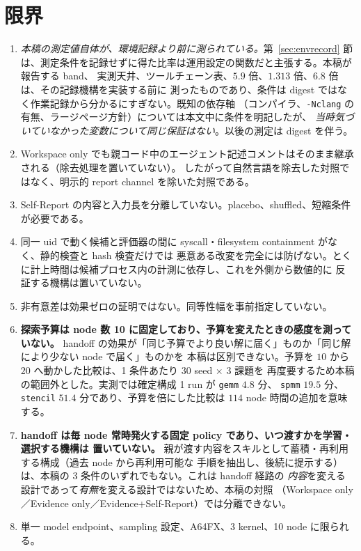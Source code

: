 \documentclass[conference,letterpaper]{IEEEtran}
\newcommand{\armW}{Workspace only}
\newcommand{\armE}{Evidence only}
\newcommand{\armS}{Evidence+Self-Report}
\begin{document}
\section{限界}
\begin{enumerate}
  \item \emph{本稿の測定値自体が、環境記録より前に測られている。}第~\ref{sec:envrecord}
    節は、測定条件を記録せずに得た比率は運用設定の関数だと主張する。本稿が報告する band、
    実測天井、ツールチェーン表、$5.9$ 倍、$1.313$ 倍、$6.8$ 倍は、その記録機構を実装する前に
    測ったものであり、条件は digest ではなく作業記録から分かるにすぎない。既知の依存軸
    （コンパイラ、\texttt{-Nclang} の有無、ラージページ方針）については本文中に条件を明記したが、
    \emph{当時気づいていなかった変数について同じ保証はない}。以後の測定は digest を伴う。
  \item \armW{} でも親コード中のエージェント記述コメントはそのまま継承される（除去処理を置いていない）。
    したがって自然言語を除去した対照ではなく、明示的 report channel を除いた対照である。
  \item Self-Report の内容と入力長を分離していない。placebo、shuffled、短縮条件が必要である。
  \item 同一 uid で動く候補と評価器の間に syscall・filesystem containment がなく、静的検査と hash 検査だけでは
    悪意ある改変を完全には防げない。とくに計上時間は候補プロセス内の計測に依存し、これを外側から数値的に
    反証する機構は置いていない。
  \item 非有意差は効果ゼロの証明ではない。同等性幅を事前指定していない。
  \item \textbf{探索予算は node 数 10 に固定しており、予算を変えたときの感度を測っていない。}
    handoff の効果が「同じ予算でより良い解に届く」ものか「同じ解により少ない node で届く」ものかを
    本稿は区別できない。予算を $10$ から $20$ へ動かした比較は、1 条件あたり $30$ seed $\times$ 3 課題を
    再度要するため本稿の範囲外とした。実測では確定構成 1 run が \texttt{gemm} $4.8$ 分、
    \texttt{spmm} $19.5$ 分、\texttt{stencil} $51.4$ 分であり、予算を倍にした比較は
    $114$ node 時間の追加を意味する。
  \item \textbf{handoff は毎 node 常時発火する固定 policy であり、いつ渡すかを学習・選択する機構は
    置いていない。} 親が渡す内容をスキルとして蓄積・再利用する構成（過去 node から再利用可能な
    手順を抽出し、後続に提示する）は、本稿の 3 条件のいずれでもない。これは handoff 経路の
    \emph{内容}を変える設計であって\emph{有無}を変える設計ではないため、本稿の対照
    （\armW{}／\armE{}／\armS{}）では分離できない。
  \item 単一 model endpoint、sampling 設定、A64FX、3 kernel、10 node に限られる。

\end{enumerate}
\end{document}
